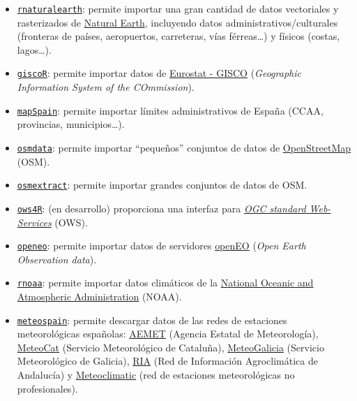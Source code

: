 \documentclass[
]{book}
\theoremstyle{break}
\theoremstyle{definition}
\theoremstyle{definition}
\theoremstyle{definition}
\theoremstyle{definition}
\theoremstyle{remark}
\begin{document}
\begin{itemize}
\item
  \href{https://docs.ropensci.org/rnaturalearth/}{\texttt{rnaturalearth}}: permite importar una gran cantidad de datos vectoriales y rasterizados de \href{http://www.naturalearthdata.com}{Natural Earth}, incluyendo datos administrativos/culturales (fronteras de países, aeropuertos, carreteras, vías férreas\ldots) y físicos (costas, lagos\ldots).
\item
  \href{https://ropengov.github.io/giscoR/}{\texttt{giscoR}}: permite importar datos de \href{https://ec.europa.eu/eurostat/web/gisco}{Eurostat - GISCO} (\emph{Geographic Information System of the COmmission}).
\item
  \href{https://ropenspain.github.io/mapSpain}{\texttt{mapSpain}}: permite importar límites administrativos de España (CCAA, provincias, municipios\ldots).
\item
  \href{https://CRAN.R-project.org/package=osmdata}{\texttt{osmdata}}: permite importar ``pequeños'' conjuntos de datos de \href{https://www.openstreetmap.org}{OpenStreetMap} (OSM).
\item
  \href{https://CRAN.R-project.org/package=osmextract}{\texttt{osmextract}}: permite importar grandes conjuntos de datos de OSM.
\item
  \href{https://github.com/eblondel/ows4R/wiki}{\texttt{ows4R}}: (en desarrollo) proporciona una interfaz para \emph{\href{https://www.ogc.org/docs/is}{OGC standard Web-Services}} (OWS).
\item
  \href{https://open-eo.github.io/openeo-r-client}{\texttt{openeo}}: permite importar datos de servidores \href{https://openeo.org}{openEO} (\emph{Open Earth Observation data}).
\item
  \href{https://CRAN.R-project.org/package=rnoaa}{\texttt{rnoaa}}: permite importar datos climáticos de la \href{https://www.ncdc.noaa.gov/cdo-web/webservices/v2}{National Oceanic and Atmospheric Administration} (NOAA).
\item
  \href{https://emf-creaf.github.io/meteospain}{\texttt{meteospain}}: permite descargar datos de las redes de estaciones meteorológicas españolas: \href{https://www.aemet.es/en/portada}{AEMET} (Agencia Estatal de Meteorología), \href{https://meteo.cat}{MeteoCat} (Servicio Meteorológico de Cataluña), \href{https://www.meteogalicia.gal/web/inicio.action}{MeteoGalicia} (Servicio Meteorológico de Galicia), \href{https://www.juntadeandalucia.es/agriculturaypesca/ifapa/riaweb/web/}{RIA} (Red de Información Agroclimática de Andalucía) y \href{https://www.meteoclimatic.net/}{Meteoclimatic} (red de estaciones meteorológicas no profesionales).

\end{itemize}
\end{document}
